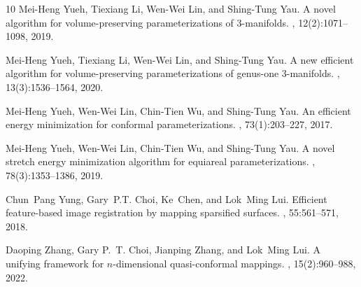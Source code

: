 \documentclass{article}
\begin{document}
\begin{thebibliography}{10}
Mei-Heng Yueh, Tiexiang Li, Wen-Wei Lin, and Shing-Tung Yau.
\newblock A novel algorithm for volume-preserving parameterizations of
  3-manifolds.
, 12(2):1071--1098, 2019.

Mei-Heng Yueh, Tiexiang Li, Wen-Wei Lin, and Shing-Tung Yau.
\newblock A new efficient algorithm for volume-preserving parameterizations of
  genus-one 3-manifolds.
, 13(3):1536--1564, 2020.

Mei-Heng Yueh, Wen-Wei Lin, Chin-Tien Wu, and Shing-Tung Yau.
\newblock An efficient energy minimization for conformal parameterizations.
, 73(1):203--227, 2017.

Mei-Heng Yueh, Wen-Wei Lin, Chin-Tien Wu, and Shing-Tung Yau.
\newblock A novel stretch energy minimization algorithm for equiareal
  parameterizations.
, 78(3):1353--1386, 2019.

Chun~Pang Yung, Gary~P.T. Choi, Ke~Chen, and Lok~Ming Lui.
\newblock Efficient feature-based image registration by mapping sparsified
  surfaces.
,
  55:561--571, 2018.

Daoping Zhang, Gary P.~T. Choi, Jianping Zhang, and Lok~Ming Lui.
\newblock A unifying framework for $n$-dimensional quasi-conformal mappings.
, 15(2):960--988, 2022.

\end{thebibliography}


\end{document}
